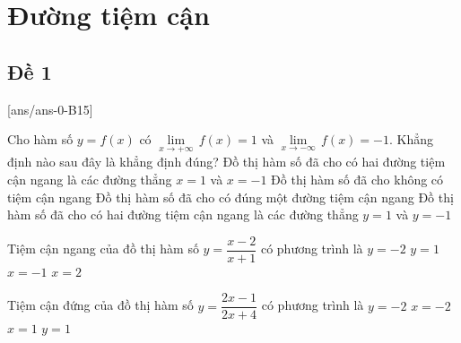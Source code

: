  \section{Đường tiệm cận}
 \subsection{Đề 1}
[ans/ans-0-B15]
\caulc%
\begin{ex}%
	Cho hàm số $y=f(x)$ có $\underset{x\to +\infty }{\mathop{\lim }}\,f(x)=1$ và $\underset{x\to -\infty }{\mathop{\lim }}\,f(x)=-1$. Khẳng định nào sau đây là khẳng định đúng?
	\choice
	{Đồ thị hàm số đã cho có hai đường tiệm cận ngang là các đường thẳng $x=1$ và $x=-1$}
	{Đồ thị hàm số đã cho không có tiệm cận ngang}
	{Đồ thị hàm số đã cho có đúng một đường tiệm cận ngang}
	{\True Đồ thị hàm số đã cho có hai đường tiệm cận ngang là các đường thẳng $y=1$ và $y=-1$}
\end{ex}

\begin{ex}%
	Tiệm cận ngang của đồ thị hàm số $y=\dfrac{x-2}{x+1}$ có phương trình là
	\choice
	{$y=-2$}
	{\True $y=1$}
	{$x=-1$}
	{$x=2$}
\end{ex}

\begin{ex}%
	Tiệm cận đứng của đồ thị hàm số $y=\dfrac{2x-1}{2x+4}$ có phương trình là
	\choice
	{$y=-2$}
	{\True $x=-2$}
	{$x=1$}
	{$y=1$}
\end{ex}

